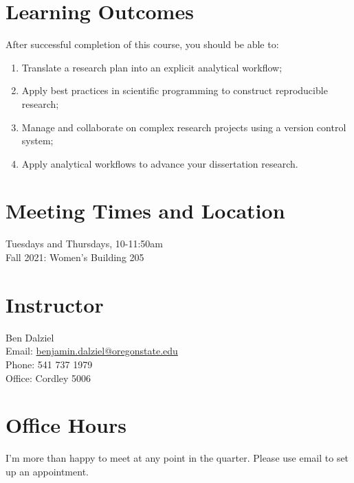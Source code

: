 \documentclass[10pt]{article}
\begin{document}
\section*{Learning Outcomes}
\noindent
After successful completion of this course, you should be able to:
\begin{enumerate}
	\itemsep0em
	\item Translate a research plan into an explicit analytical workflow;
	\item Apply best practices in scientific programming to construct reproducible research;
	\item Manage and collaborate on complex research projects using a version control system;
	\item Apply analytical workflows to advance your dissertation research.
\end{enumerate}

\section*{Meeting Times and Location}
\noindent
	Tuesdays and Thursdays, 10-11:50am\\
	Fall 2021: Women's Building 205

\section*{Instructor}
\noindent
	Ben Dalziel\\
	Email: \href{mailto:benjamin.dalziel@oregonstate.edu}{benjamin.dalziel@oregonstate.edu}\\
	Phone: 541 737 1979\\
	Office: Cordley 5006\\


\section*{Office Hours}
\noindent
	I'm more than happy to meet at any point in the quarter.
	Please use email to set up an appointment.
\end{document}
